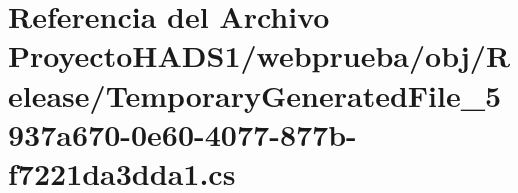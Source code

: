 \hypertarget{_proyecto_h_a_d_s1_2webprueba_2obj_2_release_2_temporary_generated_file__5937a670-0e60-4077-877b-f7221da3dda1_8cs}{}\section{Referencia del Archivo Proyecto\+H\+A\+D\+S1/webprueba/obj/\+Release/\+Temporary\+Generated\+File\+\_\+5937a670-\/0e60-\/4077-\/877b-\/f7221da3dda1.cs}
\label{_proyecto_h_a_d_s1_2webprueba_2obj_2_release_2_temporary_generated_file__5937a670-0e60-4077-877b-f7221da3dda1_8cs}
